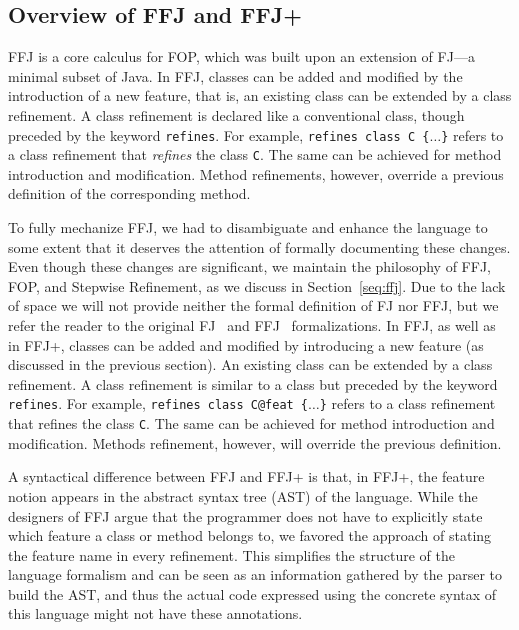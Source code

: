 
\subsection{Overview of \ac{FFJ} and \ac{FFJ+}}\label{seq:offj}

\acf{FFJ} is a core calculus for \acf{FOP}, which was built 
upon an extension of \acf{FJ}---a minimal subset of Java. 
In \ac{FFJ}, classes can be added and modified by the 
introduction of a new feature, that is, 
an existing class can be extended by a class refinement. 
A class refinement is declared like a conventional class, though 
preceded by the keyword \texttt{refines}. For example, 
\texttt{refines class C \{$\dots$\}} refers to a class
refinement that
\emph{refines} the class \texttt{C}. The same can be achieved 
for method introduction and modification. Method refinements,
however, override a previous definition of the corresponding 
method.
 
To fully mechanize \ac{FFJ}, we had to disambiguate and enhance 
the language to some extent that it deserves the attention of 
formally documenting these changes. 
Even though these changes are significant, we maintain the philosophy of \ac{FFJ}, \ac{FOP}, 
and Stepwise Refinement, as we discuss in Section~\ref{seq:ffj}.
Due to the lack of space we will not provide neither the formal definition 
of \ac{FJ} nor \ac{FFJ}, but we refer the reader to the original \ac{FJ}~\cite{igarashi_featherweight_2001}
and \ac{FFJ}~\cite{apel_feature_2008} formalizations.
In \ac{FFJ}, as well as in \ac{FFJ+}, classes can be added and 
modified by introducing a new feature (as discussed in the previous section).
An existing class can be extended by a class refinement. A class refinement is similar to a class but
preceded by the keyword \texttt{refines}. For example, \texttt{refines class C@feat \{$\dots$\}} refers to a class refinement that
refines the class \texttt{C}. The same can be achieved for method introduction and modification. Methods refinement,
however, will override the previous definition.

A syntactical difference between \ac{FFJ} and \ac{FFJ+} is that, in \ac{FFJ+}, 
the feature notion appears in the abstract syntax tree (AST) of the language.
While the designers of \ac{FFJ} argue that the programmer does not have 
to explicitly state which feature a class or method belongs to, %
we favored the approach of stating the feature name in every refinement.
This simplifies the structure of the language formalism and can be 
seen as an information gathered by the parser to build the AST, and thus 
the actual code expressed using the concrete syntax of this language 
might not have these annotations.

